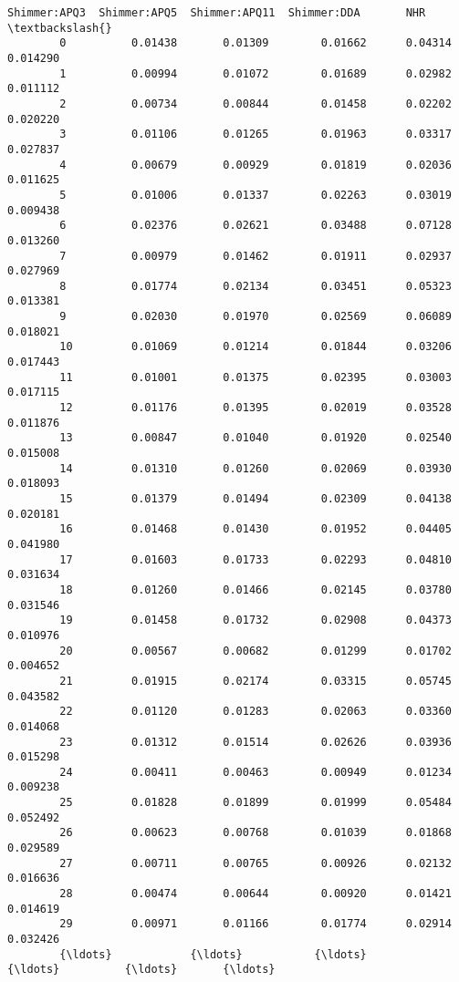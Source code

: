 \documentclass[11pt]{article}
\begin{document}
\begin{Verbatim}[commandchars=\\\{\}]
              Shimmer:APQ3  Shimmer:APQ5  Shimmer:APQ11  Shimmer:DDA       NHR  \textbackslash{}
        0          0.01438       0.01309        0.01662      0.04314  0.014290   
        1          0.00994       0.01072        0.01689      0.02982  0.011112   
        2          0.00734       0.00844        0.01458      0.02202  0.020220   
        3          0.01106       0.01265        0.01963      0.03317  0.027837   
        4          0.00679       0.00929        0.01819      0.02036  0.011625   
        5          0.01006       0.01337        0.02263      0.03019  0.009438   
        6          0.02376       0.02621        0.03488      0.07128  0.013260   
        7          0.00979       0.01462        0.01911      0.02937  0.027969   
        8          0.01774       0.02134        0.03451      0.05323  0.013381   
        9          0.02030       0.01970        0.02569      0.06089  0.018021   
        10         0.01069       0.01214        0.01844      0.03206  0.017443   
        11         0.01001       0.01375        0.02395      0.03003  0.017115   
        12         0.01176       0.01395        0.02019      0.03528  0.011876   
        13         0.00847       0.01040        0.01920      0.02540  0.015008   
        14         0.01310       0.01260        0.02069      0.03930  0.018093   
        15         0.01379       0.01494        0.02309      0.04138  0.020181   
        16         0.01468       0.01430        0.01952      0.04405  0.041980   
        17         0.01603       0.01733        0.02293      0.04810  0.031634   
        18         0.01260       0.01466        0.02145      0.03780  0.031546   
        19         0.01458       0.01732        0.02908      0.04373  0.010976   
        20         0.00567       0.00682        0.01299      0.01702  0.004652   
        21         0.01915       0.02174        0.03315      0.05745  0.043582   
        22         0.01120       0.01283        0.02063      0.03360  0.014068   
        23         0.01312       0.01514        0.02626      0.03936  0.015298   
        24         0.00411       0.00463        0.00949      0.01234  0.009238   
        25         0.01828       0.01899        0.01999      0.05484  0.052492   
        26         0.00623       0.00768        0.01039      0.01868  0.029589   
        27         0.00711       0.00765        0.00926      0.02132  0.016636   
        28         0.00474       0.00644        0.00920      0.01421  0.014619   
        29         0.00971       0.01166        0.01774      0.02914  0.032426   
        {\ldots}            {\ldots}           {\ldots}            {\ldots}          {\ldots}       {\ldots}   

\end{Verbatim}
\end{document}
